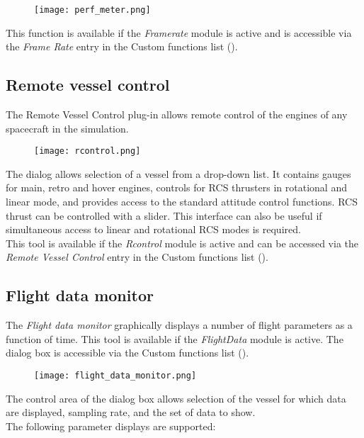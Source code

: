 \documentclass[Orbiter User Manual.tex]{subfiles}
\begin{document}
\begin{figure}[H]
	\centering
	\texttt{[image: perf\_meter.png]}
\end{figure}

\noindent
This function is available if the \textit{Framerate} module is active and is accessible via the \textit{Frame Rate} entry in the Custom functions list (\Ctrl{}).


\subsection{Remote vessel control}
The Remote Vessel Control plug-in allows remote control of the engines of any spacecraft in the simulation.

\begin{figure}[H]
	\centering
	\texttt{[image: rcontrol.png]}
\end{figure}

\noindent
The dialog allows selection of a vessel from a drop-down list. It contains gauges for main, retro and hover engines, controls for RCS thrusters in rotational and linear mode, and provides access to the standard attitude control functions. RCS thrust can be controlled with a slider. This interface can also be useful if simultaneous access to linear and rotational RCS modes is required.\\
This tool is available if the \textit{Rcontrol} module is active and can be accessed via the \textit{Remote Vessel Control} entry in the Custom functions list (\Ctrl{}).


\subsection{Flight data monitor}
The \textit{Flight data monitor} graphically displays a number of flight parameters as a function of time. This tool is available if the \textit{FlightData} module is active. The dialog box is accessible via the Custom functions list (\Ctrl{}).

\begin{figure}[H]
	\centering
	\texttt{[image: flight\_data\_monitor.png]}
\end{figure}

\noindent
The control area of the dialog box allows selection of the vessel for which data are displayed, sampling rate, and the set of data to show.\\
The following parameter displays are supported:
\end{document}
